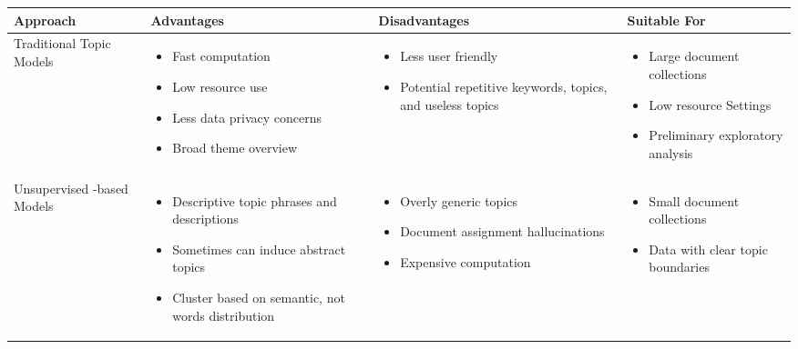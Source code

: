 \begin{table*}[h!]
\centering
\small
\begin{tabular}{>{\centering\arraybackslash}m{} m{} m{} m{}}
\toprule
\textbf{Approach} & \textbf{Advantages} & \textbf{Disadvantages} & \textbf{Suitable For} \\
\midrule
Traditional Topic Models &
\begin{itemize}[leftmargin=*,noitemsep,topsep=0pt]
\item Fast computation
\item Low resource use
\item Less data privacy concerns
\item Broad theme overview
\end{itemize} &
\begin{itemize}[leftmargin=*,noitemsep,topsep=0pt]
\item Less user friendly
\item Potential repetitive keywords, topics, and useless topics
\end{itemize} &
\begin{itemize}[leftmargin=*,noitemsep,topsep=0pt]
\item Large document collections
\item Low resource Settings
\item Preliminary exploratory analysis
\end{itemize} \\
\midrule
Unsupervised \mm{}-based Models &
\begin{itemize}[leftmargin=*,noitemsep,topsep=0pt]
\item Descriptive topic phrases and descriptions
\item Sometimes can induce abstract topics
\item Cluster based on semantic, not words distribution
\end{itemize} &
\begin{itemize}[leftmargin=*,noitemsep,topsep=0pt]
\item Overly generic topics
\item Document assignment hallucinations
\item Expensive computation
\end{itemize} &
\begin{itemize}[leftmargin=*,noitemsep,topsep=0pt]
\item Small document collections
\item Data with clear topic boundaries

\end{itemize}
\end{tabular}
\end{table*}
